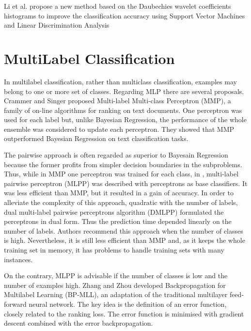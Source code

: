 Li et al. \cite{Li2003} propose a new method based on the Daubechies wavelet coefficients histograms
to improve the classification accuracy using Support Vector Machines and Linear Discrimination Analysis


\section{MultiLabel Classification}

In multilabel classification, rather than multiclass classification, 
examples may belong to one or more set of classes. Regarding MLP there are several proposals.
Crammer and Singer \cite{Crammer2003} proposed Multi-label Multi-class Perceptron (MMP), a
family of on-line algorithms for ranking on text documents. 
One perceptron was used for each label but, unlike Bayesian Regression, the performance of the whole ensemble
was considered to update each perceptron. They showed that MMP outperformed
Bayesian Regression on text classification tasks.

The pairwise approach is often regarded as superior to Bayesain Regression because the former profits from simpler decision boundaries in the subproblems. 
Thus, while in MMP one perceptron was trained for each class, in \cite{Mencia2009}, multi-label pairwise perceptron (MLPP) was described with perceptrons as base classifiers. 
It was less efficient than MMP, but it resulted in a gain of accuracy.
In order to alleviate the complexity of this approach, quadratic with the number of labels, dual multi-label pairwise perceptrons algorithm (DMLPP) \cite{LozaMencia2008} formulated the perceptrons in dual form. 
Thus the prediction time depended linearly on the number of labels. 
Authors recommend this approach when the number of classes is high. 
Nevertheless, it is still less efficient than MMP and, as it keeps the whole training set in memory, it has problems to
handle training sets with many instances. 


On the contrary, MLPP is advisable if the number of classes is low and the number of examples high. 
Zhang and Zhou \cite{Zhang2006} developed Backpropagation for Multilabel Learning (BP-MLL), an adaptation of
the traditional multilayer feed-forward neural network. The key idea is the definition of an error function, closely related to the ranking loss.
The error function is minimised with gradient descent combined with the error
backpropagation.

